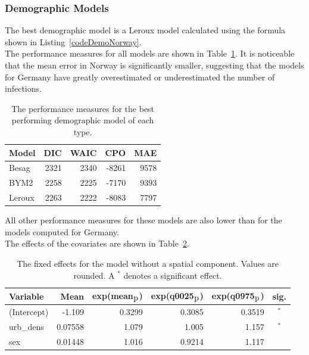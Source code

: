 \subsubsection{Demographic Models}\label{sssec:demoNorway}
The best demographic model is a Leroux model calculated using the formula shown in Listing~\ref{codeDemoNorway}. \\
The performance measures for all models are shown in Table~\ref{demoNorway}. It is noticeable that the mean error in Norway is significantly smaller, suggesting that the models for Germany have greatly overestimated or underestimated the number of infections.
\begin{table}[H] 
\caption{The performance measures for the best performing demographic model of each type. \label{demoNorway}}
\begin{tabular}{l r r r r}
\toprule
\textbf{Model}	& \textbf{DIC}	& \textbf{WAIC} & \textbf{CPO} & \textbf{MAE}\\
\midrule
Besag  & 2321 & 2340 & -8261 & 9578 \\
BYM2 & 2258 & 2225 & -7170 & 9393\\
Leroux & 2263  & 2222 & -8083 & 7797\\
\bottomrule
\end{tabular}
\end{table}
All other performance measures for these models are also lower than for the models computed for Germany. \\
The effects of the covariates are shown in Table~\ref{fixedDemoNorway_spatial}.
\begin{table}[H] 
\caption{The fixed effects for the model without a spatial component. Values are rounded. A $^*$ denotes a significant effect.\label{fixedDemoNorway_spatial}}
\begin{tabular}{l r r r r c}
\toprule
\textbf{Variable}	& \textbf{Mean}	& \textbf{exp(mean$_{\hbox{p}}$)} & \textbf{exp(q0025$_{\hbox{p}}$)} & \textbf{exp(q0975$_{\hbox{p}}$)} & \textbf{sig.}\\
\midrule
(Intercept) & -1.109 & 0.3299 & 0.3085 & 0.3519 & $^*$ \\
urb\_dens & 0.07558 & 1.079 & 1.005 & 1.157 & $^*$ \\
sex & 0.01448 & 1.016 & 0.9214 & 1.117 \\
\bottomrule
\end{tabular}
\end{table}
